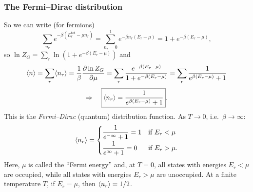 \subsubsection*{The Fermi--Dirac distribution}

So we can write (for fermions)
\begin{equation}
  \sum_{n_r}e^{-\beta(E_r^{\text{tot}}-\mu n_r)} = \sum_{n_r=0}^1e^{-\beta n_r(E_r-\mu)} = 1 + e^{-\beta(E_r-\mu)},
\end{equation}
so $\ln Z_G = \sum_r\ln\left(1+e^{-\beta(E_r-\mu)}\right)$ and
\begin{equation}
  \langle n\rangle = \sum_r\langle n_r\rangle = \frac{1}{\beta}\frac{\partial\ln Z_G}{\partial\mu}
  = \sum_r\frac{e^{-\beta(E_r-\mu)}}{1+e^{-\beta(E_r-\mu)}} = \sum_r\frac{1}{e^{\beta(E_r-\mu)}+1}
\end{equation}
\begin{equation}
  \Rightarrow\quad\boxed{\langle n_r\rangle = \frac{1}{e^{\beta(E_r-\mu)}+1}}.
\end{equation}
This is the \emph{Fermi--Dirac} (quantum) distribution function. As $T\to 0$, i.e.\ $\beta\to\infty$:
\begin{equation}
  \langle n_r\rangle = \begin{cases}\dfrac{1}{e^{-\infty}+1} = 1 & \text{if } E_r<\mu\\[6pt] \dfrac{1}{e^{\infty}+1} = 0 & \text{if } E_r>\mu .\end{cases}
\end{equation}
Here, $\mu$ is called the ``Fermi energy'' and, at $T = 0$, all states with energies $E_r<\mu$ are occupied, while all
states with energies $E_r>\mu$ are unoccupied. At a finite temperature $T$, if $E_r = \mu$, then $\langle n_r\rangle = 1/2$.

\begin{diagram}
\end{diagram}

